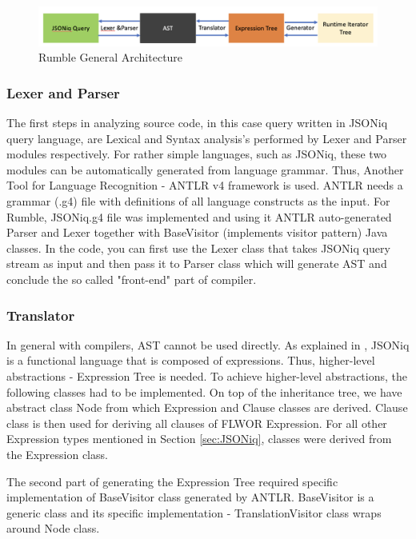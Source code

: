 \begin{figure}[h!]
	\includegraphics[width=\linewidth]{parsing_architecture.png}
	\vspace*{-5mm}
	\caption{Rumble General Architecture}
	\label{fig:Rumble_General_Architecture}
\end{figure}

\subsubsection{Lexer and Parser}
\label{sec:RumbleLexerParser}
The first steps in analyzing source code, in this case query written in JSONiq query language, are Lexical and Syntax analysis's performed by Lexer and Parser modules respectively. For rather simple languages, such as JSONiq, these two modules can be automatically generated from language grammar. Thus, Another Tool for Language Recognition - ANTLR v4 framework \cite{ANTLR} is used. ANTLR needs a grammar (.g4) file with definitions of all language constructs as the input. For Rumble, JSONiq.g4 file was implemented and using it ANTLR auto-generated Parser and Lexer together with BaseVisitor (implements visitor pattern) Java classes. In the code, you can first use the Lexer class that takes JSONiq query stream as input and then pass it to Parser class which will generate AST and conclude the so called "front-end" part of compiler.

\subsubsection{Translator}
In general with compilers, AST cannot be used directly. As explained in \cite{RumbleMLThesis}, JSONiq is a functional language that is composed of expressions. Thus, higher-level abstractions - Expression Tree is needed. To achieve higher-level abstractions, the following classes had to be implemented. On top of the inheritance tree, we have abstract class Node from which Expression and Clause classes are derived. Clause class is then used for deriving all clauses of FLWOR Expression. For all other Expression types mentioned in Section \ref{sec:JSONiq}, classes were derived from the Expression class. 

The second part of generating the Expression Tree required specific implementation of BaseVisitor class generated by ANTLR. BaseVisitor is a generic class and its specific implementation - TranslationVisitor class wraps around Node class. 

